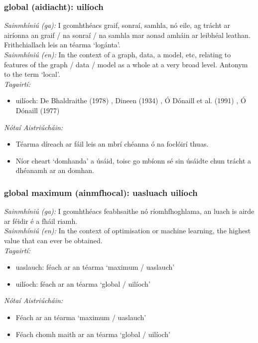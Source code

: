 \subsubsection*{global (aidiacht): uilíoch}
 \noindent \textit{Sainmhíniú (ga):} I gcomhthéacs graif, sonraí, samhla, nó eile, ag trácht ar airíonna an graif / na sonraí / na samhla mar aonad amháin ar leibhéal leathan. Frithchiallach leis an téarma `logánta'.
\\
 \noindent \textit{Sainmhíniú (en):} In the context of a graph, data, a model, etc, relating to features of the graph / data / model as a whole at a very broad level. Antonym to the term `local'.
\\
 \noindent \textit{Tagairtí:}
\begin{itemize}
	\item uilíoch: De Bhaldraithe (1978) \cite{de-bhaldraithe}, Dineen (1934) \cite{dineen}, Ó Dónaill et al. (1991) \cite{focloir-beag}, Ó Dónaill (1977) \cite{odonaill}
\end{itemize}

 \noindent \textit{Nótaí Aistriúcháin:}
\begin{itemize}
	\item Téarma díreach ar fáil leis an mbrí chéanna ó na foclóirí thuas.
	\item Níor cheart `domhanda' a úsáid, toisc go mbíonn sé sin úsáidte chun trácht a dhéanamh ar an domhan.
\end{itemize}


\subsubsection*{global maximum (ainmfhocal): uasluach uilíoch}
 \noindent \textit{Sainmhíniú (ga):} I gcomhthéacs feabhsaithe nó ríomhfhoghlama, an luach is airde ar féidir é a fháil riamh.
\\
 \noindent \textit{Sainmhíniú (en):} In the context of optimisation or machine learning, the highest value that can ever be obtained.
\\
 \noindent \textit{Tagairtí:}
\begin{itemize}
	\item uaslauch: féach ar an téarma `maximum / uaslauch'
	\item uilíoch: féach ar an téarma `global / uilíoch'
\end{itemize}

 \noindent \textit{Nótaí Aistriúcháin:}
\begin{itemize}
	\item Féach ar an téarma `maximum / uaslauch'
	\item Féach chomh maith ar an téarma `global / uilíoch'
\end{itemize}


